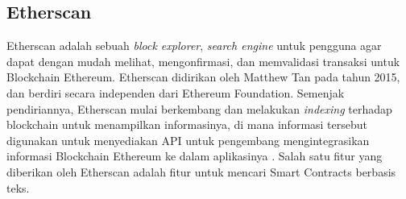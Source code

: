 \subsection{Etherscan}
\label{subsec:etherscan}

Etherscan adalah sebuah \textit{block explorer}, \textit{search engine} untuk pengguna agar dapat dengan mudah melihat, mengonfirmasi, dan memvalidasi transaksi untuk Blockchain Ethereum. Etherscan didirikan oleh Matthew Tan pada tahun 2015, dan berdiri secara independen dari Ethereum Foundation. Semenjak pendiriannya, Etherscan mulai berkembang dan melakukan \textit{indexing} terhadap blockchain untuk menampilkan informasinya, di mana informasi tersebut digunakan untuk menyediakan API untuk pengembang mengintegrasikan informasi Blockchain Ethereum ke dalam aplikasinya \parencite{etherscan2024}. Salah satu fitur yang diberikan oleh Etherscan adalah fitur untuk mencari Smart Contracts berbasis teks.